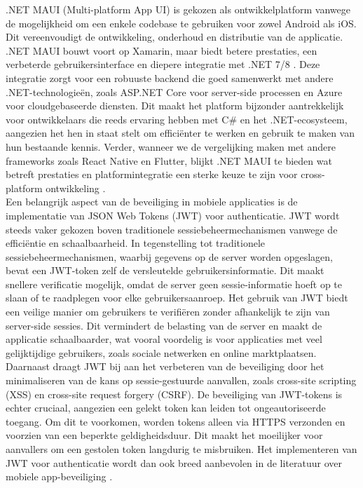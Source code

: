 .NET MAUI (Multi-platform App UI) is gekozen als ontwikkelplatform vanwege de mogelijkheid om een enkele codebase te gebruiken voor zowel Android als iOS. Dit vereenvoudigt de ontwikkeling, onderhoud en distributie van de applicatie. .NET MAUI bouwt voort op Xamarin, maar biedt betere prestaties, een verbeterde gebruikersinterface en diepere integratie met .NET 7/8 \autocite{Klesman2023}. Deze integratie zorgt voor een robuuste backend die goed samenwerkt met andere .NET-technologieën, zoals ASP.NET Core voor server-side processen en Azure voor cloudgebaseerde diensten. Dit maakt het platform bijzonder aantrekkelijk voor ontwikkelaars die reeds ervaring hebben met C# en het .NET-ecosysteem, aangezien het hen in staat stelt om efficiënter te werken en gebruik te maken van hun bestaande kennis. Verder, wanneer we de vergelijking maken met andere frameworks zoals React Native en Flutter, blijkt .NET MAUI te bieden wat betreft prestaties en platformintegratie een sterke keuze te zijn voor cross-platform ontwikkeling \autocite{Kuppan2024}. \\

Een belangrijk aspect van de beveiliging in mobiele applicaties is de implementatie van JSON Web Tokens (JWT) voor authenticatie. JWT wordt steeds vaker gekozen boven traditionele sessiebeheermechanismen vanwege de efficiëntie en schaalbaarheid. In tegenstelling tot traditionele sessiebeheermechanismen, waarbij gegevens op de server worden opgeslagen, bevat een JWT-token zelf de versleutelde gebruikersinformatie. Dit maakt snellere verificatie mogelijk, omdat de server geen sessie-informatie hoeft op te slaan of te raadplegen voor elke gebruikersaanroep.
Het gebruik van JWT biedt een veilige manier om gebruikers te verifiëren zonder afhankelijk te zijn van server-side sessies. Dit vermindert de belasting van de server en maakt de applicatie schaalbaarder, wat vooral voordelig is voor applicaties met veel gelijktijdige gebruikers, zoals sociale netwerken en online marktplaatsen. Daarnaast draagt JWT bij aan het verbeteren van de beveiliging door het minimaliseren van de kans op sessie-gestuurde aanvallen, zoals cross-site scripting (XSS) en cross-site request forgery (CSRF).
De beveiliging van JWT-tokens is echter cruciaal, aangezien een gelekt token kan leiden tot ongeautoriseerde toegang. Om dit te voorkomen, worden tokens alleen via HTTPS verzonden en voorzien van een beperkte geldigheidsduur. Dit maakt het moeilijker voor aanvallers om een gestolen token langdurig te misbruiken. Het implementeren van JWT voor authenticatie wordt dan ook breed aanbevolen in de literatuur over mobiele app-beveiliging \autocite{Gao2023}. \\

